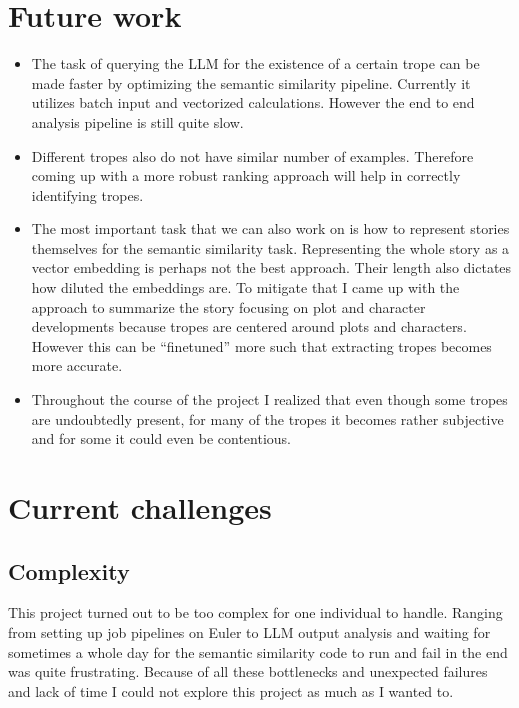\documentclass[11pt]{article}
\begin{document}
\section{Future work}
\begin{itemize}
  \item The task of querying the LLM for the existence of a certain trope can be made faster by optimizing the semantic similarity pipeline. Currently it utilizes batch input and vectorized calculations. However the end to end analysis pipeline is still quite slow.
  \item Different tropes also do not have similar number of examples. Therefore coming up with a more robust ranking approach will help in correctly identifying tropes.
  \item The most important task that we can also work on is how to represent stories themselves for the semantic similarity task. Representing the whole story as a vector embedding is perhaps not the best approach. Their length also dictates how diluted the embeddings are. To mitigate that I came up with the approach to summarize the story focusing on plot and character developments because tropes are centered around plots and characters. However this can be ``finetuned'' more such that extracting tropes becomes more accurate.
  \item Throughout the course of the project I realized that even though some tropes are undoubtedly present, for many of the tropes it becomes rather subjective and for some it could even be contentious.
\end{itemize}

\section{Current challenges}
\subsection{Complexity}
This project turned out to be too complex for one individual to handle. Ranging from setting up job pipelines on Euler to LLM output analysis and waiting for sometimes a whole day for the semantic similarity code to run and fail in the end was quite frustrating. Because of all these bottlenecks and unexpected failures and lack of time I could not explore this project as much as I wanted to.
\end{document}

